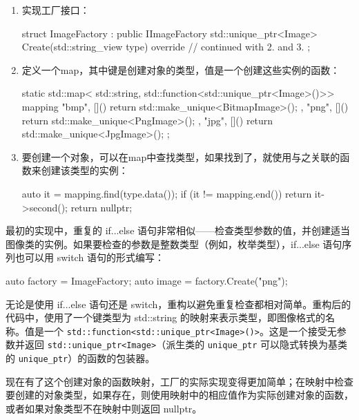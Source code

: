 \begin{enumerate}
\item
实现工厂接口：

\begin{cpp}
struct ImageFactory : public IImageFactory
{
    std::unique_ptr<Image> Create(std::string_view type) override
    {
        // continued with 2. and 3.
    }
};
\end{cpp}

\item
定义一个map，其中键是创建对象的类型，值是一个创建这些实例的函数：

\begin{cpp}
static std::map<
    std::string,
    std::function<std::unique_ptr<Image>()>> mapping
{
    { "bmp", []() {return std::make_unique<BitmapImage>(); } },
    { "png", []() {return std::make_unique<PngImage>(); } },
    { "jpg", []() {return std::make_unique<JpgImage>(); } }
};
\end{cpp}

\item
要创建一个对象，可以在map中查找类型，如果找到了，就使用与之关联的函数来创建该类型的实例：

\begin{cpp}
auto it = mapping.find(type.data());
if (it != mapping.end())
    return it->second();
return nullptr;
\end{cpp}
\end{enumerate}


最初的实现中，重复的 if...else 语句非常相似——检查类型参数的值，并创建适当图像类的实例。如果要检查的参数是整数类型（例如，枚举类型），if...else 语句序列也可以用 switch 语句的形式编写：

\begin{cpp}
auto factory = ImageFactory{};
auto image = factory.Create("png");
\end{cpp}

无论是使用 if...else 语句还是 switch，重构以避免重复检查都相对简单。重构后的代码中，使用了一个键类型为 std::string 的映射来表示类型，即图像格式的名称。值是一个 \verb|std::function<std::unique_ptr<Image>()>|。这是一个接受无参数并返回 \verb|std::unique_ptr<Image>|（派生类的 \verb|unique_ptr| 可以隐式转换为基类的 \verb|unique_ptr|）的函数的包装器。

现在有了这个创建对象的函数映射，工厂的实际实现变得更加简单；在映射中检查要创建的对象类型，如果存在，则使用映射中的相应值作为实际创建对象的函数，或者如果对象类型不在映射中则返回 nullptr。

